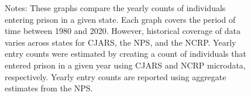 \begin{figure}
\begin{minipage}{\linewidth}
Notes: These graphs compare the yearly counts of individuals entering prison in a given state. Each graph covers the period of time between 1980 and 2020. However, historical coverage of data varies across states for CJARS, the NPS, and the NCRP. Yearly entry counts were estimated by creating a count of individuals that entered prison in a given year using CJARS and NCRP microdata, respectively. Yearly entry counts are reported using aggregate estimates from the NPS.
\end{minipage}
\end{figure}